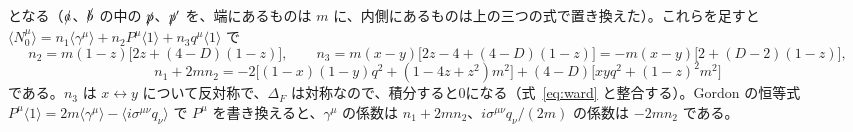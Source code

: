 \documentclass[a4paper,10pt]{ltjsarticle}
\newcommand{\sw}[1]{\langle #1\rangle}
\begin{document}
となる（$\slashed a$、$\slashed b$ の中の $\slashed p$、$\slashed p'$ を、端にあるものは $m$ に、内側にあるものは上の三つの式で置き換えた）。これらを足すと $\sw{N_0^\mu}=n_1\sw{\gamma^\mu}+n_2P^\mu\sw1+n_3q^\mu\sw1$ で
\begin{equation*}
n_2=m(1-z)\bigl[2z+(4-D)(1-z)\bigr],\qquad
n_3=m(x-y)\bigl[2z-4+(4-D)(1-z)\bigr]=-m(x-y)\bigl[2+(D-2)(1-z)\bigr],
\end{equation*}
\begin{equation*}
n_1+2mn_2=-2\bigl[(1-x)(1-y)q^2+(1-4z+z^2)m^2\bigr]+(4-D)\bigl[xyq^2+(1-z)^2m^2\bigr]
\end{equation*}
である。$n_3$ は $x\leftrightarrow y$ について反対称で、$\Delta_F$ は対称なので、積分すると0になる（式~\eqref{eq:ward} と整合する）。Gordon の恒等式 $P^\mu\sw1=2m\sw{\gamma^\mu}-\sw{i\sigma^{\mu\nu}q_\nu}$ で $P^\mu$ を書き換えると、$\gamma^\mu$ の係数は $n_1+2mn_2$、$i\sigma^{\mu\nu}q_\nu/(2m)$ の係数は $-2mn_2$ である。
\end{document}
